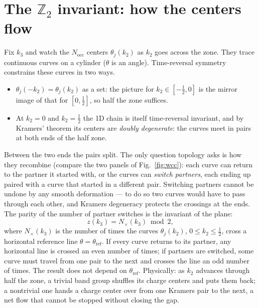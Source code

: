 \section{The \texorpdfstring{$\mathbb{Z}_2$}{Z2} invariant: how the centers flow}
\label{sec:z2def}

Fix $k_3$ and watch the $N_{\mathrm{occ}}$ centers $\theta_j(k_2)$ as $k_2$
goes across the zone. They trace continuous curves on a cylinder ($\theta$
is an angle). Time-reversal symmetry constrains these curves in two ways.
\begin{itemize}[leftmargin=2em]
\item $\theta_j(-k_2) = \theta_j(k_2)$ as a set: the picture for
$k_2\in[-\tfrac12,0]$ is the mirror image of that for $[0,\tfrac12]$, so
half the zone suffices.
\item At $k_2 = 0$ and $k_2 = \tfrac12$ the 1D chain is itself
time-reversal invariant, and by Kramers' theorem its centers are
\emph{doubly degenerate}: the curves meet in pairs at both ends of the
half zone.
\end{itemize}
Between the two ends the pairs split. The only question topology asks is
how they recombine (compare the two panels of Fig.~\ref{fig:wcc}): each curve can return to the
partner it started with, or the curves can \emph{switch partners}, each
ending up paired with a curve that started in a different pair. Switching
partners cannot be undone by any smooth deformation --- to do so two curves
would have to pass through each other, and Kramers degeneracy protects the
crossings at the ends. The parity of the number of partner switches is the
invariant of the plane:
\begin{equation}
z(k_3) = N_{\times}(k_3) \bmod 2 ,
\label{eq:zcount}
\end{equation}
where $N_{\times}(k_3)$ is the number of times the curves $\theta_j(k_2)$,
$0\le k_2\le\tfrac12$, cross a horizontal reference line
$\theta = \theta_{\mathrm{ref}}$.
If every curve returns to its partner, any horizontal line is crossed an
even number of times; if partners are switched, some curve must travel
from one pair to the next and crosses the line an odd number of times.
The result does not depend on $\theta_{\mathrm{ref}}$. Physically: as $k_2$
advances through half the zone, a trivial band group shuffles its charge
centers and puts them back; a nontrivial one hands a charge center over
from one Kramers pair to the next, a net flow that cannot be stopped
without closing the gap.

